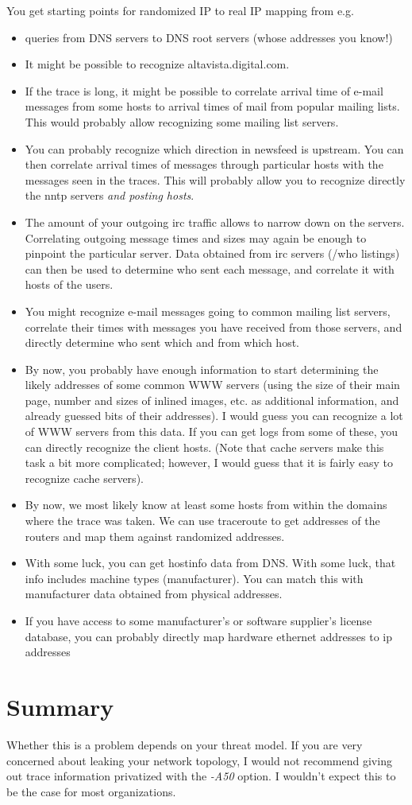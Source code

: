 \documentclass[10pt,onecolumn]{article}
\begin{document}
You get starting points for randomized IP to real IP mapping from e.g.
\begin{itemize}
\item queries from DNS servers to DNS root servers (whose addresses you know!)
\item It might be possible to recognize altavista.digital.com.
\item If the trace is long, it might be possible to correlate arrival
    time of e-mail messages from some hosts to arrival times of mail
    from popular mailing lists.  This would probably allow recognizing
    some mailing list servers.
\item You can probably recognize which direction in newsfeed is
    upstream.  You can then correlate arrival times of messages through
    particular hosts with the messages seen in the traces.  This will
    probably allow you to recognize directly the nntp servers \emph{and
    posting hosts}.
\item The amount of your outgoing irc traffic allows to narrow down on
    the servers.  Correlating outgoing message times and sizes may again be
    enough to pinpoint the particular server.  Data obtained from irc
    servers (/who listings) can then be used to determine who sent
    each message, and correlate it with hosts of the users.
\item You might recognize e-mail messages going to common mailing list
    servers, correlate their times with messages you have received
    from those servers, and directly determine who sent which and from
    which host.
\item By now, you probably have enough information to start determining
    the likely addresses of some common WWW servers (using the size of
    their main page, number and sizes of inlined images, etc. as
    additional information, and already guessed bits of their
    addresses).  I would guess you can recognize a lot of WWW servers
    from this data.  If you can get logs from some of these, you
    can directly recognize the client hosts.  (Note that cache servers
    make this task a bit more complicated; however, I would guess that
    it is fairly easy to recognize cache servers).
\item By now, we most likely know at least some hosts from within the
    domains where the trace was taken.  We can use traceroute to get
    addresses of the routers and map them against randomized
    addresses.
\item With some luck, you can get hostinfo data from DNS.  With some
    luck, that info includes machine types (manufacturer).  You can
    match this with manufacturer data obtained from physical addresses.
\item If you have access to some manufacturer's or software supplier's
    license database, you can probably directly map hardware ethernet
    addresses to ip addresses
\end{itemize}

\section{Summary}

Whether this is a problem depends on your threat model.  If you are
very concerned about leaking your network topology, I would not
recommend giving out trace information privatized with the \emph{-A50}
option.  I wouldn't expect this to be the case for most organizations.
\end{document}
